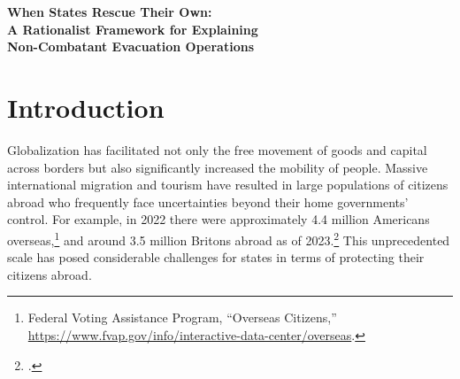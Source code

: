 \documentclass[12pt]{article}
\begin{document}
\begin{titlepage}
\thispagestyle{fancy}
\begin{center}
\vspace*{2cm}
{\Large\bfseries When States Rescue Their Own:\\ A Rationalist Framework for Explaining\\ Non-Combatant Evacuation Operations}
\vspace{1.5cm}

\begin{abstract}
\noindent What explains the variation in how states protect their citizens abroad during international crises? Despite the growing number of nationals overseas and the increasing frequency of evacuation operations, political science has paid remarkably little attention to this question. This paper develops a rationalist cost-minimization framework organized around two dimensions---the cost of action and the cost of inaction---that together generate predictions about when states will undertake vigorous evacuations, facilitated departures, or deliberate non-responses. I illustrate the framework with case studies of U.S.\ behavior during the 2006 and 2024 Lebanon crises, the 2023 Israel crisis, and a multi-state comparison of the 2011 Libya evacuations. I then propose a measurement strategy and pilot dataset design grounded in the Uppsala Conflict Data Program. The framework consolidates a wide range of situational factors into two analyzable dimensions and offers a foundation for systematic empirical investigation of a phenomenon that sits at the intersection of international political economy and security studies.
\end{abstract}
\end{center}
\end{titlepage}

\doublespacing

\section{Introduction}

Globalization has facilitated not only the free movement of goods and capital across borders but also significantly increased the mobility of people. Massive international migration and tourism have resulted in large populations of citizens abroad who frequently face uncertainties beyond their home governments' control. For example, in 2022 there were approximately 4.4 million Americans overseas,\footnote{Federal Voting Assistance Program, ``Overseas Citizens,'' \url{https://www.fvap.gov/info/interactive-data-center/overseas}.} and around 3.5 million Britons abroad as of 2023.\footnote{\citet{OCarroll2024}.} This unprecedented scale has posed considerable challenges for states in terms of protecting their citizens abroad.
\end{document}

